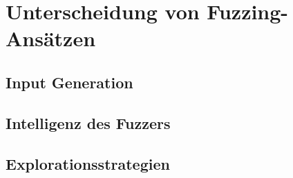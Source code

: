 
\section{Unterscheidung von Fuzzing-Ansätzen}\label{sec:unterscheidung-von-fuzzern}
\subsection{Input Generation}\label{subsec:input-generation}

\subsection{Intelligenz des Fuzzers}\label{subsec:intelligenz-des-fuzzers}

\subsection{Explorationsstrategien}\label{subsec:explorationsstrategien}

